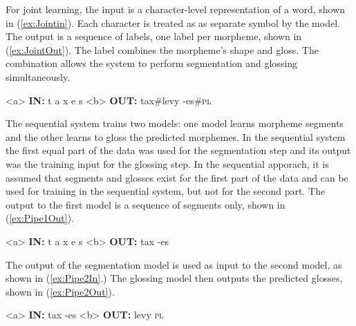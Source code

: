 For joint learning, the input is a character-level representation of a word, shown in (\ref{ex:Jointin}). Each character is treated as as separate symbol by the model. The output is a sequence of labels, one label per morpheme, shown in (\ref{ex:JointOut}). The label combines the morpheme's shape and gloss. The combination allows the system to perform segmentation and glossing simultaneously. 

\pex   
\label{ex:JointInOut}
\a<a> \textbf{IN:} \hspace{6 mm} t \hspace{2 mm} a \hspace{2 mm} x \hspace{2 mm} e \hspace{2 mm} s 
\label{ex:Jointin}
\a<b> \textbf{OUT:} \hspace{2 mm} tax\#levy \hspace{3 mm} -es\#\textsc{pl} 
\label{ex:JointOut}
\xe

The sequential system trains two models: one model learns morpheme segments and the other learns to gloss the predicted morphemes. In the sequential system the first equal part of the data was used for the segmentation step and its output was the training input for the glossing step. In the sequential apporach, it is assumed that segments and glosses exist for the first part of the data and can be used for training in the sequential system, but not for the second part. The output to the first model is a sequence of segments only, shown in (\ref{ex:Pipe1Out}). 

\pex  
\label{ex:Pipe1InOut}
\a<a> \textbf{IN:} \hspace{6 mm} t \hspace{2 mm} a \hspace{2 mm} x \hspace{2 mm} e \hspace{2 mm} s 
\label{ex:Pipe1in}
\a<b> \textbf{OUT:} \hspace{2 mm} tax \hspace{3 mm} -es
\label{ex:Pipe1Out}
\xe

The output of the segmentation model is used as input to the second model, as shown in (\ref{ex:Pipe2In}.) The glossing model then outputs the predicted glosses, shown in (\ref{ex:Pipe2Out}). 

\pex  
\label{ex:Pipe2InOut}
\a<a> \textbf{IN:} \hspace{6 mm} tax \hspace{3 mm} -es
\label{ex:Pipe2In}
\a<b> \textbf{OUT:} \hspace{2 mm} levy \hspace{2 mm} \textsc{pl}
\label{ex:Pipe2Out}
\xe

